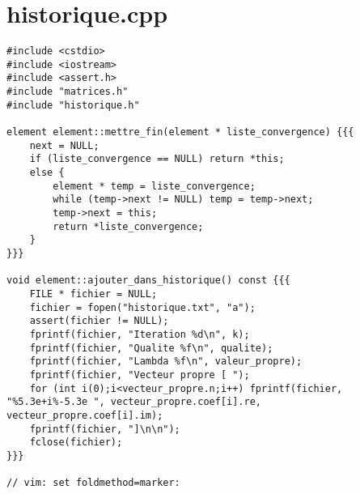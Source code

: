 \documentclass[a4paper]{article}
\begin{document}
\section{historique.cpp}
\begin{verbatim}
#include <cstdio>
#include <iostream>
#include <assert.h>
#include "matrices.h"
#include "historique.h"

element element::mettre_fin(element * liste_convergence) {{{
    next = NULL;
    if (liste_convergence == NULL) return *this;
    else {
        element * temp = liste_convergence;
        while (temp->next != NULL) temp = temp->next;
        temp->next = this;
        return *liste_convergence;
    }
}}}

void element::ajouter_dans_historique() const {{{
    FILE * fichier = NULL;
    fichier = fopen("historique.txt", "a");
    assert(fichier != NULL);
    fprintf(fichier, "Iteration %d\n", k);
    fprintf(fichier, "Qualite %f\n", qualite);
    fprintf(fichier, "Lambda %f\n", valeur_propre);
    fprintf(fichier, "Vecteur propre [ ");
    for (int i(0);i<vecteur_propre.n;i++) fprintf(fichier, "%5.3e+i%-5.3e ", vecteur_propre.coef[i].re, vecteur_propre.coef[i].im);
    fprintf(fichier, "]\n\n");
    fclose(fichier);
}}}

// vim: set foldmethod=marker:
\end{verbatim}
\end{document}
